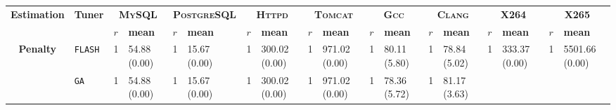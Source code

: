 \begin{tabular}{clllllllllllllllll}
\hline
\multicolumn{1}{c|}{\multirow{2}{*}{\textbf{Estimation}}} &
  \multicolumn{1}{c|}{\multirow{2}{*}{\textbf{Tuner}}} &
  \multicolumn{2}{c|}{\textbf{\textsc{MySQL}}} &
  \multicolumn{2}{c|}{\textbf{\textsc{PostgreSQL}}} &
  \multicolumn{2}{c|}{\textbf{\textsc{Httpd}}} &
  \multicolumn{2}{c|}{\textbf{\textsc{Tomcat}}} &
  \multicolumn{2}{c|}{\textbf{\textsc{Gcc}}} &
  \multicolumn{2}{c|}{\textbf{\textsc{Clang}}} &
  \multicolumn{2}{c|}{\textbf{\textsc{X264}}} &
  \multicolumn{2}{c}{\textbf{\textsc{X265}}} \\
\cline{3-18}
\multicolumn{1}{c|}{} &
  \multicolumn{1}{c|}{} &
  \textbf{$r$} &
  \multicolumn{1}{l|}{\textbf{mean}} &
  \textbf{$r$} &
  \multicolumn{1}{l|}{\textbf{mean}} &
  \textbf{$r$} &
  \multicolumn{1}{l|}{\textbf{mean}} &
  \textbf{$r$} &
  \multicolumn{1}{l|}{\textbf{mean}} &
  \textbf{$r$} &
  \multicolumn{1}{l|}{\textbf{mean}} &
  \textbf{$r$} &
  \multicolumn{1}{l|}{\textbf{mean}} &
  \textbf{$r$} &
  \multicolumn{1}{l|}{\textbf{mean}} &
  \textbf{$r$} &
  \textbf{mean} \\ \hline
\multicolumn{1}{c|}{\multirow{7}{*}{\textbf{Penalty}}} &
  \multicolumn{1}{l|}{\texttt{FLASH}} &
  \cellcolor{blue!15}1 &
  \multicolumn{1}{l|}{\cellcolor{blue!15}54.88 (0.00)} &
  \cellcolor{blue!15}1 &
  \multicolumn{1}{l|}{\cellcolor{blue!15}15.67 (0.00)} &
  \cellcolor{blue!15}1 &
  \multicolumn{1}{l|}{\cellcolor{blue!15}300.02 (0.00)} &
  \cellcolor{blue!15}1 &
  \multicolumn{1}{l|}{\cellcolor{blue!15}971.02 (0.00)} &
  \cellcolor{blue!15}1 &
  \multicolumn{1}{l|}{\cellcolor{blue!15}80.11 (5.80)} &
  \cellcolor{blue!15}1 &
  \multicolumn{1}{l|}{\cellcolor{blue!15}78.84 (5.02)} &
  \cellcolor{blue!15}1 &
  \multicolumn{1}{l|}{\cellcolor{blue!15}333.37 (0.00)} &
  \cellcolor{blue!15}1 &
  \cellcolor{blue!15}5501.66 (0.00) \\
\multicolumn{1}{c|}{} &
  \multicolumn{1}{l|}{\texttt{GA}} &
  \cellcolor{blue!15}1 &
  \multicolumn{1}{l|}{\cellcolor{blue!15}54.88 (0.00)} &
  \cellcolor{blue!15}1 &
  \multicolumn{1}{l|}{\cellcolor{blue!15}15.67 (0.00)} &
  \cellcolor{blue!15}1 &
  \multicolumn{1}{l|}{\cellcolor{blue!15}300.02 (0.00)} &
  \cellcolor{blue!15}1 &
  \multicolumn{1}{l|}{\cellcolor{blue!15}971.02 (0.00)} &
  \cellcolor{blue!15}1 &
  \multicolumn{1}{l|}{\cellcolor{blue!15}78.36 (5.72)} &
  \cellcolor{blue!15}1 &
  \multicolumn{1}{l|}{\cellcolor{blue!15}81.17 (3.63)} &

\end{tabular}
